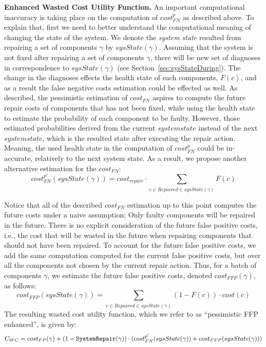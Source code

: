 \documentclass[a4paper,11pt]{report}
\newcommand\sysrep[1]{{\tt SystemRepair(#1)}}
\begin{document}
\noindent \textbf{Enhanced Wasted Cost Utility Function.}
An important computational inaccuracy is taking place on the computation of $cost_{FN}^p$ as described above. To explain that, first we need to better understand the computational meaning of changing the state of the system. We denote the \emph{system state} resulted from repairing a set of components $\gamma$ by $sysState(\gamma)$. Assuming that the system is not fixed after repairing a set of components $\gamma$, there will be new set of diagnoses in correspondence to $sysState(\gamma)$ (see Section~\ref{sec:sysStateDuring}).
The change in the diagnoses effects the health state of each components, $F(c)$, and as a result the false negative costs estimation could be effected as well. As described, the pessimistic estimation of $cost_{FN}$ aspires to compute the future repair costs of components that has not been fixed, while using the health state to estimate the probability of each component to be faulty. However, those estimated probabilities derived from the current $system state$ instead of the next $system state$, which is the resulted state after executing the repair action. Meaning, the used health state in the computation of $cost_{FN}^p$ could be in-accurate, relatively to the next system state.
As a result, we propose another alternative estimation for the $cost_{FN}$:
\[ cost_{FN}^{{{p}'}}(sysState(\gamma))=cost_{repair}\cdot \sum_{c\in \overline{Repaired} \in sysState(\gamma)} F(c)\]

Notice that all of the described $cost_{FN}$ estimation up to this point computes the future costs under a naive assumption; Only faulty components will be repaired in the future. There is no explicit consideration of the future false positive costs, i.e., the cost that will be wasted in the future when repairing components that should not have been repaired. 
To account for the future false positive costs, we add the same computation computed for the current false positive costs, but over all the components not chosen by the current repair action. 
Thus, for a batch of components $\gamma$, we estimate the future false positive costs, denoted $cost_{FFP}(\gamma)$, as follows:
\[
cost_{FFP}(sysState(\gamma))=\sum_{c\in \overline{Repaired} \in sysState(\gamma)} (1-F(c))\cdot cost(c) 
\] 
The resulting wasted cost utility function, which we refer to as ``pessimistic FFP enhanced'',  is given by:
\begin{multline}
C_{WC}=cost_{FP}(\gamma)+(1-\sysrep{\gamma}) \cdot (cost_{FN}^{{{p}'}}(sysState(\gamma))+ cost_{FFP}(sysState(\gamma)))
\end{multline}
\end{document}
